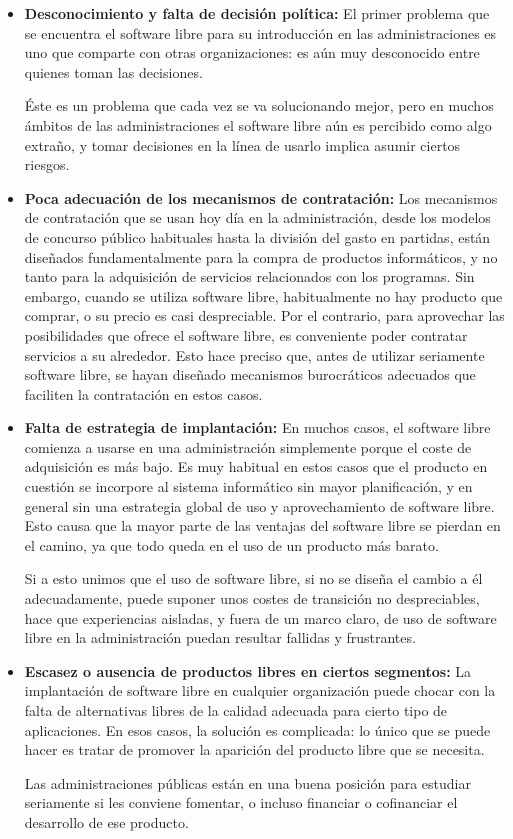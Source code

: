 \begin{itemize}

\item \textbf{Desconocimiento y falta de decisión política:} El primer problema que se encuentra el software libre para su introducción en las administraciones es uno que comparte con otras organizaciones: es aún muy desconocido entre quienes toman las decisiones.

Éste es un problema que cada vez se va solucionando mejor, pero en muchos ámbitos de las administraciones el software libre aún es percibido como algo extraño, y tomar decisiones en la línea de usarlo implica asumir ciertos riesgos.

\item \textbf{Poca adecuación de los mecanismos de contratación:} Los mecanismos de contratación que se usan hoy día en la administración, desde los modelos de concurso público habituales hasta la división del gasto en partidas, están diseñados fundamentalmente para la compra de productos informáticos, y no tanto para la adquisición de servicios relacionados con los programas. Sin embargo, cuando se utiliza software libre, habitualmente no hay producto que comprar, o su precio es casi despreciable. Por el contrario, para aprovechar las posibilidades que ofrece el software libre, es conveniente poder contratar servicios a su alrededor. Esto hace preciso que, antes de utilizar seriamente software libre, se hayan diseñado mecanismos burocráticos adecuados que faciliten la contratación en estos casos.

\item \textbf{Falta de estrategia de implantación:} En muchos casos, el software libre comienza a usarse en una administración simplemente porque el coste de adquisición es más bajo. Es muy habitual en estos casos que el producto en cuestión se incorpore al sistema informático sin mayor planificación, y en general sin una estrategia global de uso y aprovechamiento de software libre. Esto causa que la mayor parte de las ventajas del software libre se pierdan en el camino, ya que todo queda en el uso de un producto más barato.

Si a esto unimos que el uso de software libre, si no se diseña el cambio a él adecuadamente, puede suponer unos costes de transición no despreciables, hace que experiencias aisladas, y fuera de un marco claro, de uso de software libre en la administración puedan resultar fallidas y frustrantes.

\item \textbf{Escasez o ausencia de productos libres en ciertos segmentos:} La implantación de software libre en cualquier organización puede
chocar con la falta de alternativas libres de la calidad adecuada para cierto tipo de aplicaciones. En esos casos, la solución es complicada:
lo único que se puede hacer es tratar de promover la aparición del producto libre que se necesita.

Las administraciones públicas están en una buena posición para estudiar seriamente si les conviene fomentar, o incluso financiar o cofinanciar el desarrollo de ese producto.

\end{itemize}

